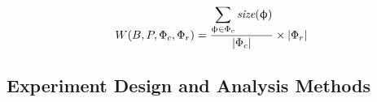 \documentclass{sig-alternate}
\begin{document}
\vspace*{-.1in}

\begin{equation} \label{eq:space_calculate}
W(B,P, \Phi_c, \Phi_r) = \frac{\displaystyle \sum_{\upphi \in \Phi_c}
                   \mbox{{\em size}}(\upphi)}
         {|\Phi_c|} \times |\Phi_r|
\end{equation}

\vspace*{-.05in}







\vspace*{-.05in}
\subsection{Experiment Design and Analysis Methods}
\label{sec:design}
\end{document}
